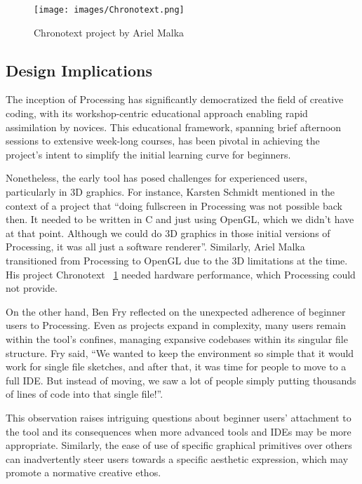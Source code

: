 \clearpage

\begin{figure}[h]
  \texttt{[image: images/Chronotext.png]}
  \caption{Chronotext project by Ariel Malka}
  \label{fig:chronotext}
\end{figure}

\subsection{Design Implications}



The inception of Processing has significantly democratized the field of creative coding, with its workshop-centric educational approach enabling rapid assimilation by novices. This educational framework, spanning brief afternoon sessions to extensive week-long courses, has been pivotal in achieving the project’s intent to simplify the initial learning curve for beginners. 

Nonetheless, the early tool has posed challenges for experienced users, particularly in 3D graphics. For instance, Karsten Schmidt mentioned in the context of a project that \enquote{doing fullscreen in Processing was not possible back then. It needed to be written in C and just using OpenGL, which we didn’t have at that point. Although we could do 3D graphics in those initial versions of Processing, it was all just a software renderer}. Similarly, Ariel Malka transitioned from Processing to OpenGL due to the 3D limitations at the time. His project Chronotext ~\ref{fig:chronotext} needed hardware performance, which Processing could not provide.

On the other hand, Ben Fry reflected on the unexpected adherence of beginner users to Processing. Even as projects expand in complexity, many users remain within the tool’s confines, managing expansive codebases within its singular file structure. Fry said, \enquote{We wanted to keep the environment so simple that it would work for single file sketches, and after that, it was time for people to move to a full IDE. But instead of moving, we saw a lot of people simply putting thousands of lines of code into that single file!}. 

This observation raises intriguing questions about beginner users’ attachment to the tool and its consequences when more advanced tools and IDEs may be more appropriate. Similarly, the ease of use of specific graphical primitives over others can inadvertently steer users towards a specific aesthetic expression, which may promote a normative creative ethos.

